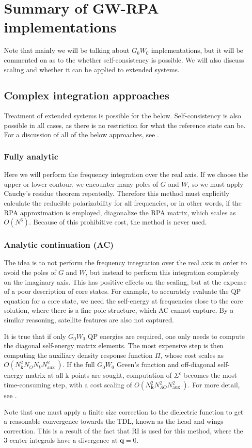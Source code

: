 \section{Summary of GW-RPA implementations}
Note that mainly we will be talking about $G_0W_0$ implementations, but it will be commented on as to the whether self-consistency is possible. We will also discuss scaling and whether it can be applied to extended systems.
\subsection{Complex integration approaches}
Treatment of extended systems is possible for the below. Self-consistency is also possible in all cases, as there is no restriction for what the reference state can be. For a discussion of all of the below approaches, see \cite{golze_gw_2019}.
\subsubsection{Fully analytic}
 Here we will perform the frequency integration over the real axis. If we choose the upper or lower contour, we encounter many poles of $G$ and $W$, so we must apply Cauchy's residue theorem repeatedly. Therefore this method must explicitly calculate the reducible polarizability for all frequencies, or in other words, if the RPA approximation is employed, diagonalize the RPA matrix, which scales as $O(N^6)$. Because of this prohibitive cost, the method is never used.
\subsubsection{Analytic continuation (AC)}
 The idea is to not perform the frequency integration over the real axis in order to avoid the poles of $G$ and $W$, but instead to perform this integration completely on the imaginary axis. This has positive effects on the scaling, but at the expense of a poor description of core states. For example, to accurately evaluate the QP equation for a core state, we need the self-energy at frequencies close to the core solution, where there is a fine pole structure, which AC cannot capture. By a similar reasoning, satellite features are also not captured. 
\begin{tcolorbox}[colback=blue!5!white,colframe=blue!75!black,title=Scaling analysis for extended systems]
It is true that if only $G_0 W_0$ QP energies are required, one only needs to compute the diagonal self-energy matrix elements. The most expensive step is then computing the auxiliary density response function $\Pi$, whose cost scales as $O\left(N_{\bm{k}}^2 N_{O} N_V N_{\text {aux }}^2\right)$.  If the full $G_0 W_0$ Green's function and off-diagonal self-energy matrix at all k-points are sought, computation of $\Sigma ^c$ becomes the most time-consuming step, with a cost scaling of $O\left(N_{\bm{k}}^2 N_{AO}^2 N_{\text {aux }}^2\right)$. For more detail, see \cite{Zhu2020-nt}.
\end{tcolorbox}
Note that one must apply a finite size correction to the dielectric function to get a reasonable convergence towards the TDL, known as the head and wings correction. This is a result of the fact that RI is used for this method, where the 3-center integrals have a divergence at $\mathbf{q} = 0$.
